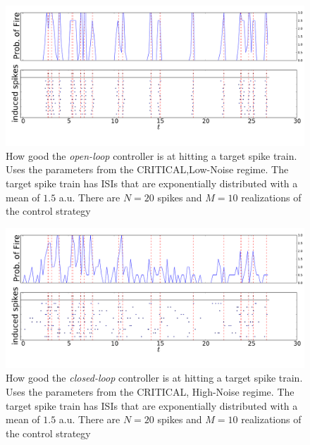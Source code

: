 \documentclass{article}
\begin{document}
\begin{figure}[htp]     
\begin{center}  
  \includegraphics[width=.99\textwidth]{Figs/TrainController/CRITLN_ol_trains_sim_10.pdf}
  \caption[ ]{How good the {\sl open-loop} controller is at hitting a target
  spike train. Uses the parameters from the CRITICAL,Low-Noise regime. The
  target spike train has ISIs that are exponentially distributed with a
  mean of $1.5$ a.u. There are $N=20$ spikes and $M=10$ realizations of the
  control strategy} 
  \label{fig:targettrain_ol_critlownoise}    
\end{center} 
\end{figure}   
\begin{figure}[htp]     
\begin{center}  
  \includegraphics[width=.99\textwidth]{Figs/TrainController/CRITHN_cl_trains_sim_10.pdf}
  \caption[ ]{How good the {\sl closed-loop} controller is at hitting a target
  spike train. Uses the parameters from the CRITICAL, High-Noise regime. The
  target spike train has ISIs that are exponentially distributed with a
  mean of $1.5$ a.u. There are $N=20$ spikes and $M=10$ realizations of the
  control strategy}
  \label{fig:targettrain_cl_critlownoise}  
\end{center}
\end{figure}   
\end{document}
